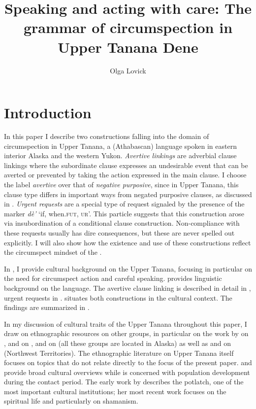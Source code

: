 \documentclass[output=paper,colorlinks,citecolor=brown]{langscibook}
\title[Speaking and acting with care]{Speaking and acting with care: The grammar of circumspection in Upper Tanana Dene}
\author{Olga Lovick\affiliation{University of Saskatchewan}}
\begin{document}
\maketitle

\section{Introduction}
\label{section:intro}

In this paper I describe two constructions falling into the domain of circumspection in Upper Tanana, a  (Athabascan) language spoken in eastern interior Alaska and the western Yukon. 
\textit{Avertive linkings} are adverbial clause linkings where the subordinate clause expresses an undesirable event that can be averted or prevented by taking the action expressed in the main clause. I choose the label \textit{avertive} over that of \textit{negative purposive}, since in Upper Tanana, this clause type differs in important ways from negated purposive clauses, as discussed in . \textit{Urgent requests} are a special type of request signaled by the presence of the marker \textit{dè'} `if, when.\textsc{fut}, \textsc{ur}'. This particle suggests that this construction arose via insubordination of a conditional clause construction. Non-compliance with these requests usually has dire consequences, but these are never spelled out explicitly. I will also show how the existence and use of these constructions reflect the circumspect mindset of the .

In , I provide cultural background on the Upper Tanana, focusing in particular on the need for circumspect action and careful speaking.  provides linguistic background on the  language. The avertive clause linking is described in detail in , urgent requests in .  situates both constructions in the cultural context. The findings are summarized in .

In my discussion of cultural traits of the Upper Tanana throughout this paper, I draw on ethnographic resources on other  groups, in particular on the work by \citet{NelsonR1973} on , \citet{NelsonRMautnerKBaneG1982} and \citet{NelsonR1983} on , and \citet{ScollonRScollonS1981} on   (all these groups are located in Alaska) as well as \citet{RushforthS1985} and \citet{RushforthSChisholmJ1991} on  (Northwest Territories). The ethnographic literature on Upper Tanana itself focuses on topics that do not relate directly to the focus of the present paper. \citet{McKennanR1959} and \citet{McKennanR1981} provide broad cultural overviews while \citet{McKennanR1969} is concerned with population development during the contact period. The early work by \citet{GuedonMF1974, GuedonMF1981} describes the potlatch, one of the most important cultural institutions; her most recent work \citep{GuedonMF2005} focuses on the spiritual life and particularly on shamanism. 
\end{document}
